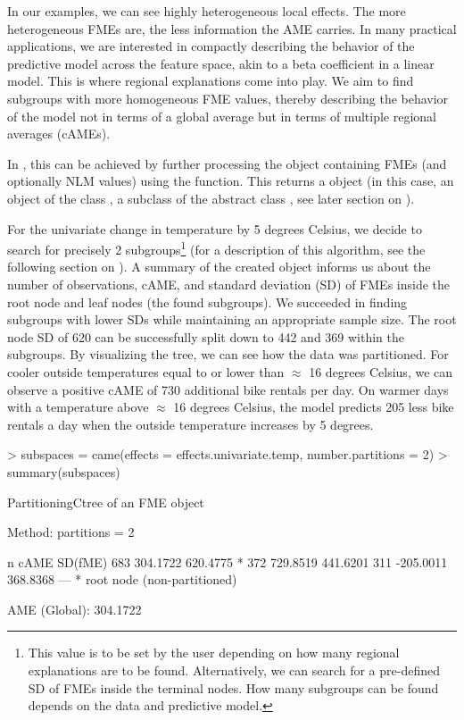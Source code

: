 In our examples, we can see highly heterogeneous local effects. The more heterogeneous FMEs are, the less information the AME carries. In many practical applications, we are interested in compactly describing the behavior of the predictive model across the feature space, akin to a beta coefficient in a linear model. This is where regional explanations come into play. We aim to find subgroups with more homogeneous FME values, thereby describing the behavior of the model not in terms of a global average but in terms of multiple regional averages (cAMEs).
\par
In , this can be achieved by further processing the  object containing FMEs (and optionally NLM values) using the  function. This returns a  object (in this case, an object of the class , a subclass of the abstract class , see later section on ). 
\par
For the univariate change in temperature by 5 degrees Celsius, we decide to search for precisely 2 subgroups\footnote{This value is to be set by the user depending on how many regional explanations are to be found. Alternatively, we can search for a pre-defined SD of FMEs inside the terminal nodes. How many subgroups can be found depends on the data and predictive model.} (for a description of this algorithm, see the following section on ).
A summary of the created object informs us about the number of observations, cAME, and standard deviation (SD) of FMEs inside the root node and leaf nodes (the found subgroups). We succeeded in finding subgroups with lower SDs while maintaining an appropriate sample size. The root node SD of 620 can be successfully split down to 442 and 369 within the subgroups. By visualizing the tree, we can see how the data was partitioned. For cooler outside temperatures equal to or lower than $\approx$ 16 degrees Celsius, we can observe a positive cAME of 730 additional bike rentals per day. On warmer days with a temperature above $\approx$ 16 degrees Celsius, the model predicts 205 less bike rentals a day when the outside temperature increases by 5 degrees.

\begin{example}
> subspaces = came(effects = effects.univariate.temp, number.partitions = 2)
> summary(subspaces)
\end{example}

\begin{example}
PartitioningCtree of an FME object

Method:  partitions = 2

   n      cAME  SD(fME)  
 683  304.1722 620.4775 *
 372  729.8519 441.6201  
 311 -205.0011 368.8368  
---
* root node (non-partitioned)

AME (Global): 304.1722
\end{example}

